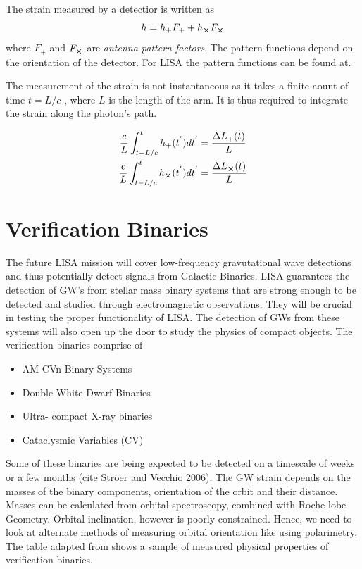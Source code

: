 \documentclass[12pt,a4paper,oneside]{book}
\begin{document}
The strain measured by a detectior is written as 
\begin{equation}
\label{eq:detector_strain}
h = h_{+} F_{+} + h_{\cross} F_{\cross}
\end{equation}
where $F_{+}$ and $F_{\cross}$ are \emph{antenna pattern factors}. The pattern functions depend on the orientation of the detector.
For LISA the pattern functions can be found at.
 
The measurement of the strain is not instantaneous as it takes a finite aount of time $t = L/c$ , where $L$ is the length of the arm. It is thus required to integrate the strain along the photon's path.

\begin{align}
\label{eq: photon path}
\frac{c}{L} \int_{t - L/c}^{t} h_{+}(t^{'}) dt^{'} &= \frac{\Delta L_{+}(t)}{L} \\
\frac{c}{L} \int_{t - L/c}^{t} h_{\cross}(t^{'}) dt^{'} &= \frac{\Delta L_{\cross}(t)}{L}
\end{align}

\section*{Verification Binaries}

The future LISA mission will cover low-frequency gravutational  wave detections and thus potentially detect signals from Galactic Binaries. LISA guarantees the detection of GW's from stellar mass binary systems that are strong enough to be detected and studied through electromagnetic observations. They will be crucial in testing the proper functionality of LISA. The detection of GWs from these systems will also open up the door to study the physics of compact objects. The verification binaries comprise of 

\begin{itemize}
\item AM CVn Binary Systems
\item Double White Dwarf Binaries
\item Ultra- compact X-ray binaries
\item Cataclysmic Variables (CV)
\end{itemize}

Some of these binaries are being expected to be detected on a timescale of weeks or a few months (cite Stroer and Vecchio 2006). The GW strain depends on the masses of the binary components, orientation of the orbit and their distance. Masses can be calculated from orbital spectroscopy, combined with Roche-lobe Geometry. Orbital inclination, however is poorly constrained. Hence, we need to look at alternate methods of measuring orbital orientation like using polarimetry. The table adapted from shows a sample of measured physical properties of verification binaries. 
\end{document}
